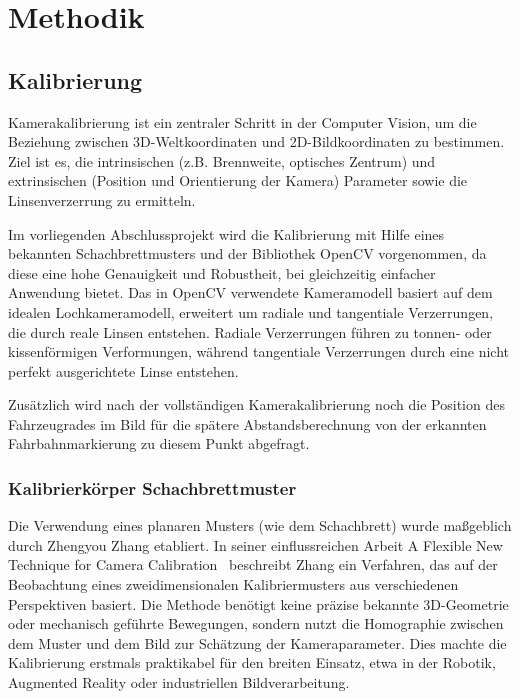 \chapter{Methodik} 

\label{Methodik}
\section{Kalibrierung}
\label{chapter_calibration}
Kamerakalibrierung ist ein zentraler Schritt in der Computer Vision, um die Beziehung zwischen 3D-Weltkoordinaten und 2D-Bildkoordinaten zu bestimmen. Ziel ist es, die intrinsischen (z.B. Brennweite, optisches Zentrum) und extrinsischen (Position und Orientierung der Kamera) Parameter sowie die Linsenverzerrung zu ermitteln.

Im vorliegenden Abschlussprojekt wird die Kalibrierung mit Hilfe eines bekannten Schachbrettmusters und der Bibliothek OpenCV vorgenommen, da diese eine hohe Genauigkeit und Robustheit, bei gleichzeitig einfacher Anwendung bietet.
Das in OpenCV verwendete Kameramodell basiert auf dem idealen Lochkameramodell, erweitert um radiale und tangentiale Verzerrungen, die durch reale Linsen entstehen. Radiale Verzerrungen führen zu tonnen- oder kissenförmigen Verformungen, während tangentiale Verzerrungen durch eine nicht perfekt ausgerichtete Linse entstehen.

Zusätzlich wird nach der vollständigen Kamerakalibrierung noch die Position des Fahrzeugrades im Bild für die spätere Abstandsberechnung von der erkannten Fahrbahnmarkierung zu diesem Punkt abgefragt.

    \subsection{Kalibrierkörper Schachbrettmuster}
    Die Verwendung eines planaren Musters (wie dem Schachbrett) wurde ma{\ss}geblich durch Zhengyou Zhang etabliert. 
    In seiner einflussreichen Arbeit \glqq A Flexible New Technique for Camera Calibration\grqq\ \cite{Zhang2000} beschreibt Zhang ein Verfahren, das auf der Beobachtung eines zweidimensionalen Kalibriermusters aus verschiedenen Perspektiven basiert. Die Methode benötigt keine präzise bekannte 3D-Geometrie oder mechanisch geführte Bewegungen, sondern nutzt die Homographie zwischen dem Muster und dem Bild zur Schätzung der Kameraparameter. Dies machte die Kalibrierung erstmals praktikabel für den breiten Einsatz, etwa in der Robotik, Augmented Reality oder industriellen Bildverarbeitung.

